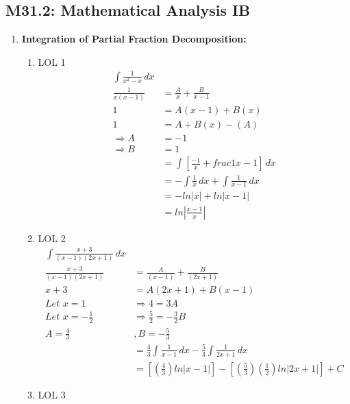 \documentclass{article}
\begin{document}
\subsection*{M31.2: Mathematical Analysis IB}
    \begin{enumerate}
        \item \textbf{Integration of Partial Fraction Decomposition:} \\
        \begin{enumerate}
            \item LOL 1
            \begin{align*}
                \int \frac{1}{x^2-x} \,dx \\
                \frac {1}{x(x-1)}&=\frac{A}{x}+\frac{B}{x-1} \\
                1&=A(x-1)+B(x) \\
                1&=A+B(x)-(A) \\
                \Rightarrow A&=-1 \\
                \Rightarrow B&=1 \\
                &=\int [\frac{-1}{x}+frac{1}{x-1}] \,dx \\
                &= -\int \frac{1}{x} \,dx + \int \frac{1}{x-1} \,dx \\
                &= -ln|x|+ln|x-1| \\
                &= ln|\frac{x-1}{x}|
            \end{align*}
            \item LOL 2
            \begin{align*}
                \int \frac{x+3}{(x-1)(2x+1)} \,dx \\
                \frac {x+3}{(x-1)(2x+1)}&=\frac{A}{(x-1)}+\frac{B}{(2x+1)} \\
                x+3&=A(2x+1)+B(x-1) \\
                \textit{Let $x=1$}&\Rightarrow 4=3A \\
                \textit{Let $x=-\frac{1}{2}$}&\Rightarrow \frac{5}{2}=-\frac{3}{2}B \\
                A=\frac{4}{3}&,B=-\frac{5}{3}\\
                &=\frac{4}{3}\int\frac{1}{x-1}\,dx - \frac{5}{3}\int\frac{1}{2x+1}\,dx \\
                &=[(\frac{4}{3})ln|x-1|]-[(\frac{5}{3})(\frac{1}{2})ln|2x+1|]+C
            \end{align*}
            \item LOL 3
            \begin{align*}

\end{align*}
\end{enumerate}
\end{enumerate}
\end{document}
